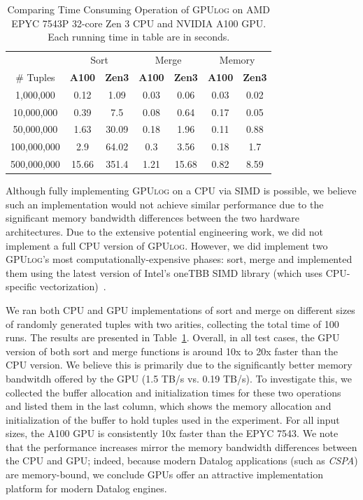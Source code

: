 \documentclass[nonacm,sigplan]{acmart}
\newcommand{\tool}{\textsc{GPUlog}}
\begin{document}
\begin{table}[]
    \centering
    \fontsize{9}{11}\selectfont
    \caption{\fontsize{9}{11}\selectfont Comparing Time Consuming Operation of \tool{} on AMD EPYC 7543P 32-core Zen 3 CPU and NVIDIA A100 GPU. Each running time in table are in seconds.}
    \label{tab:gdlog-cpu}
    \begin{tabular}{c|c c|c c|c c}
    \toprule
    & \multicolumn{2}{c}{Sort} & \multicolumn{2}{c}{Merge} & \multicolumn{2}{c}{Memory} \\
    \# Tuples  & \textbf{A100} & \textbf{Zen3} & \textbf{A100} & \textbf{Zen3} & \textbf{A100} & \textbf{Zen3} \\
    \hline
    1,000,000 & 0.12 & 1.09 & 0.03 & 0.06 & 0.03 & 0.02 \\
    10,000,000 & 0.39 & 7.5 & 0.08 & 0.64 & 0.17 & 0.05 \\
    50,000,000 & 1.63 & 30.09 & 0.18 & 1.96 & 0.11 & 0.88 \\
    100,000,000 & 2.9 & 64.02 & 0.3 & 3.56 & 0.18 & 1.7 \\
    500,000,000 & 15.66 & 351.4 & 1.21 & 15.68 & 0.82 & 8.59 \\
    \bottomrule
    \end{tabular}
\end{table}

Although fully implementing \tool{} on a CPU via SIMD is possible, we believe such an implementation would not achieve similar performance due to the significant memory bandwidth differences between the two hardware architectures. Due to the extensive potential engineering work, we did not implement a full CPU version of \tool{}. However, we did implement two \tool{}'s most computationally-expensive phases: sort, merge and implemented them using the latest version of Intel's oneTBB SIMD library (which uses CPU-specific vectorization)~\cite{onetbb}.

We ran both CPU and GPU implementations of sort and merge on different sizes of randomly generated tuples with two arities, collecting the total time of 100 runs. The results are presented in Table~\ref{tab:gdlog-cpu}. Overall, in all test cases, the GPU version of both sort and merge functions is around 10x to 20x faster than the CPU version. We believe this is primarily due to the significantly better memory bandwitdh offered by the GPU (1.5 TB/s vs. 0.19 TB/s). To investigate this, we collected the buffer allocation and initialization times for these two operations and listed them in the last column, which shows the memory allocation and initialization of the buffer to hold tuples used in the experiment. For all input sizes, the A100 GPU is consistently 10x faster than the EPYC 7543. We note that the performance increases mirror the memory bandwidth differences between the CPU and GPU; indeed, because modern Datalog applications (such as \textit{CSPA}) are memory-bound, we conclude GPUs offer an attractive implementation platform for modern Datalog engines.
 
\end{document}

